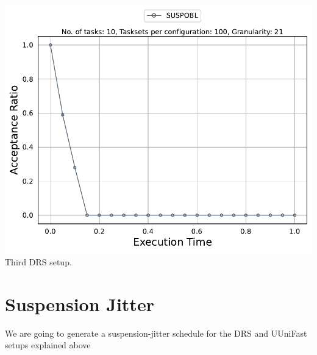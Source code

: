 \documentclass[]{article}
\begin{document}
\begin{minipage}[t]{0.48\linewidth}
		\includegraphics[width=\linewidth]{SUSPOBL_DRS_3rdSetup.pdf}
		Third DRS setup.
		\vspace{0.3cm}
	\end{minipage}

	\clearpage
	\section{Suspension Jitter}
{
\raggedleft We are going to generate a suspension-jitter schedule for the DRS and UUniFast setups explained above \newline
}
\end{document}
